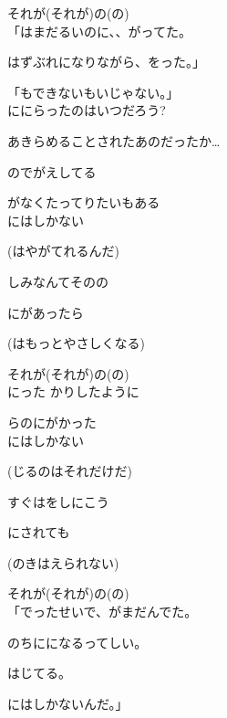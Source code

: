 それが(それが)の(の)
\\

「はまだるいのに、、がってた。

はずぶれになりながら、をった。」

「もできないもいじゃない。」
\\

ににらったのはいつだろう?

あきらめることされたあのだったか…

のでがえしてる

がなくたってりたいもある
\\

にはしかない

(はやがてれるんだ)

しみなんてそのの

にがあったら

(はもっとやさしくなる)

それが(それが)の(の)
\\

にった かりしたように

らのにがかった
\\

にはしかない

(じるのはそれだけだ)

すぐはをしにこう

にされても

(のきはえられない)

それが(それが)の(の)
\\

「でったせいで、がまだんでた。

のちにになるってしい。

はじてる。

にはしかないんだ。」
\\

